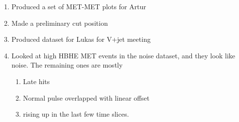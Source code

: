

\begin{enumerate}
\item Produced a set of MET-MET plots for Artur
\item Made a preliminary cut position
\item Produced dataset for Lukas for V+jet meeting
\item Looked at high HBHE MET events in the noise dataset, and they look like noise.  The remaining ones are mostly
   \begin{enumerate}
   \item Late hits
   \item Normal pulse overlapped with linear offset
   \item rising up in the last few time slices.
   \end{enumerate}
\end{enumerate}



